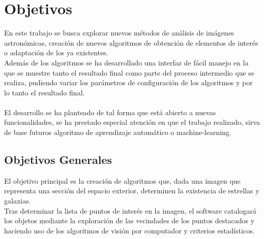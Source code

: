 	\section{Objetivos}
	\label{sec:objetivos}
	En este trabajo se busca explorar nuevos métodos de análisis de imágenes astronómicas, creación de nuevos algoritmos de obtención de elementos de interés o adaptación de los ya existentes.\\
	Además de los algoritmos se ha desarrollado una interfaz de fácil manejo en la que se muestre tanto el resultado final como parte del proceso intermedio que se realiza, pudiendo variar los parámetros de configuración de los algoritmos y por lo tanto el resultado final.\\
	\\
	El desarrollo se ha planteado de tal forma que está abierto a nuevas funcionalidades, se ha prestado especial atención en que el trabajo realizado, sirva de base futuros algoritmo de aprendizaje automático o machine-learning.
	
	\subsection{Objetivos Generales}
	
	El objetivo principal es la creación de algoritmos que, dada una imagen que representa una sección del espacio exterior, determinen la existencia de estrellas y galaxias.
	\\
	Tras determinar la lista de puntos de interés en la imagen, el software catalogará los objetos mediante la exploración de las vecindades de los puntos destacados y haciendo uso de los algoritmos de visión por computador y criterios estadísticos.
	
